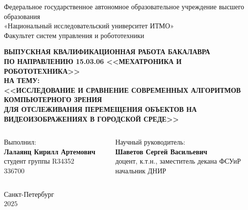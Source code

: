 \documentclass{beamer} %
\date{\today}
\begin{document}
\begin{frame}
  \begin{center}\tiny
    Федеральное государственное автономное образовательное учреждение высшего образования \\
    «Национальный исследовательский университет ИТМО»\\
    Факультет систем управления и робототехники
  \end{center}

  \begin{center}\tiny
    \textbf{\MakeUppercase{ВЫПУСКНАЯ КВАЛИФИКАЦИОННАЯ РАБОТА БАКАЛАВРА \\ ПО НАПРАВЛЕНИЮ 15.03.06 <<Мехатроника и робототехника>>}}\\
    \vspace{0.2cm}
    \textbf{\MakeUppercase{на тему:}}\\
    \vspace{0.1cm}
    \textbf{\MakeUppercase{<<Исследование и сравнение современных алгоритмов
    компьютерного зрения \\ для отслеживания перемещения объектов на видеоизображениях в
    городской среде>>}}
  \end{center}

  \vspace{0.3cm}

  \begin{columns}
    \begin{column}{0.50\textwidth}
      \begin{center}\tiny
        Выполнил: \\
        \vspace{0.1cm}
        \textbf{Лалаянц Кирилл Артемович}\\
        студент группы R34352 \\
        336700\\
      \end{center}
    \end{column}

    \begin{column}{0.50\textwidth}
      \begin{center}\tiny
        Научный руководитель:\\
        \vspace{0.1cm}
        \textbf{Шаветов Сергей Васильевич} \\
        доцент, к.т.н., заместитель декана ФСУиР\\
        начальник ДНИР \\
      \end{center}
    \end{column}
  \end{columns}

  \vspace{0.5cm}
  \begin{center}\tiny
    Санкт-Петербург \\
    $2025$
  \end{center}
\end{frame}
\end{document}
